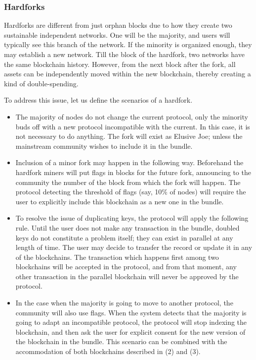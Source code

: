 \begin{multicols}{2}
\vspace{-.6cm}

\subsubsection{Hardforks}\label{subsubsec-4.3.d}

\vspace{-.4cm}

Hardforks are different from just orphan blocks due to how they create two sustainable independent networks. One will be the majority, and users will typically see this branch of the network. If the minority is organized enough, they may establish a new network. Till the block of the hardfork, two networks have the same blockchain history. However, from the next block after the fork, all assets can be independently moved within the new blockchain, thereby creating a kind of double-spending.

To address this issue, let us define the scenarios of a hardfork.

\begin{itemize}
\item[(1)] The majority of nodes do not change the current protocol, only the minority buds off with a new protocol incompatible with the current. In this case, it is not necessary to do anything. The fork will exist as Elusive Joe; unless the mainstream community wishes to include it in the bundle.
\item[(2)] Inclusion of a minor fork may happen in the following way. Beforehand the hardfork miners will put flags in blocks for the future fork, announcing to the community the number of the block from which the fork will happen. The protocol detecting the threshold of flags (say, 10\% of nodes) will require the user to explicitly include this blockchain as a new one in the bundle.
\item[(3)] To resolve the issue of duplicating keys, the protocol will apply the following rule. Until the user does not make any transaction in the bundle, doubled keys do not constitute a problem itself; they can exist in parallel at any length of time. The user may decide to transfer the record or update it in any of the blockchains. The transaction which happens first among two blockchains will be accepted in the protocol, and from that moment, any other transaction in the parallel blockchain will never be approved by the protocol.
\item[(4)] In the case when the majority is going to move to another protocol, the community will also use flags. When the system detects that the majority is going to adapt an incompatible protocol, the protocol will stop indexing the blockchain, and then ask the user for explicit consent for the new version of the blockchain in the bundle. This scenario can be combined with the accommodation of both blockchains described in (2) and (3).
\end{itemize}


\end{multicols}
